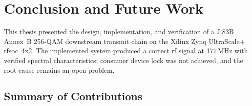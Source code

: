 

\chapter{Conclusion and Future Work}
\label{ch:conclusion}

This thesis presented the design, implementation, and verification
of a J.83B Annex~B 256-QAM downstream transmit chain on the
Xilinx Zynq UltraScale+ \ac{rfsoc}~4x2.
The implemented system produced a correct \ac{rf} signal at
177\,MHz with verified spectral characteristics; consumer device
lock was not achieved, and the root cause remains an open problem.

\section{Summary of Contributions}
\label{sec:contributions_summary}

